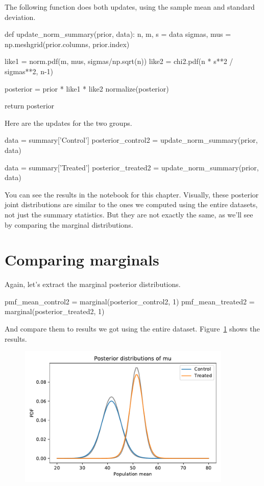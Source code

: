 \documentclass[12pt]{book}
\theoremstyle{exercise}
\begin{document}
The following function does both updates, using the sample mean and
standard deviation.

\begin{code}
def update_norm_summary(prior, data):
    n, m, s = data
    sigmas, mus = np.meshgrid(prior.columns, prior.index)
    
    like1 = norm.pdf(m, mus, sigmas/np.sqrt(n))
    like2 = chi2.pdf(n * s**2 / sigmas**2, n-1)
    
    posterior = prior * like1 * like2
    normalize(posterior)
    
    return posterior
\end{code}

Here are the updates for the two groups.

\begin{code}
data = summary['Control']
posterior_control2 = update_norm_summary(prior, data)

data = summary['Treated']
posterior_treated2 = update_norm_summary(prior, data)
\end{code}

You can see the results in the notebook for this chapter.
Visually, these posterior joint distributions are similar to the ones we
computed using the entire datasets, not just the summary statistics. 
But they are not exactly the same, as we'll see by comparing the marginal
distributions.

\section{Comparing marginals}

Again, let's extract the marginal posterior distributions.

\begin{code}
pmf_mean_control2 = marginal(posterior_control2, 1)
pmf_mean_treated2 = marginal(posterior_treated2, 1)
\end{code}

And compare them to results we got using the entire dataset.
Figure~\ref{fig11-05} shows the results.

\begin{figure}
\centerline{\includegraphics[width=4in]{figs/fig11-05.pdf}}
\caption{}
\label{fig11-05}
\end{figure}
\end{document}
